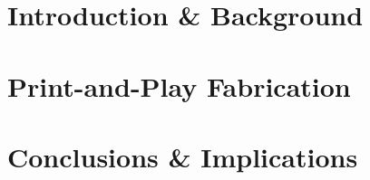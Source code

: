 \documentclass[ oneside,openright,titlepage,numbers=noenddot,%
                headinclude,footinclude,cleardoublepage=empty,abstract=on,
                BCOR=5mm,paper=a4,fontsize=11pt
                ]{scrreprt}
\begin{document}
	\frenchspacing
	\raggedbottom
	\pagestyle{plain}

	
	
	\cleardoublepage
	\cleardoublepage
	\cleardoublepage
	\cleardoublepage
	\cleardoublepage
	\cleardoublepage
	
	\cleardoublepage
	\pagestyle{scrheadings}
	\cleardoublepage
	\part{Introduction \& Background}
		\label{pt:background}
			
		\cleardoublepage
	\part{Print-and-Play Fabrication} 
		\label{pt:print-and-play}
	\part{Conclusions \& Implications} 
		\label{pt:implications}

\end{document}
